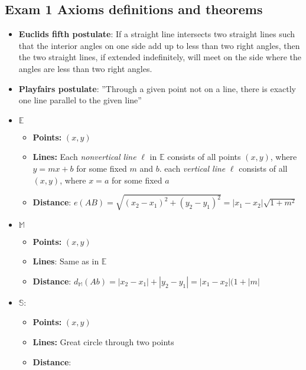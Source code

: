 \documentclass{report}
\begin{document}
    \subsection{Exam 1 Axioms definitions and theorems}
    \begin{itemize}
    \item \textbf{Euclids fifth postulate}: If a straight line intersects two straight lines such that the interior angles on one side add up to less than two right angles, then the two straight lines, if extended indefinitely, will meet on the side where the angles are less than two right angles.
    \item \textbf{Playfairs postulate}: ”Through a given point not on a line, there is exactly one line parallel to the given line”
        \item \textbf{$\mathbb{E}$}
            \begin{itemize}
                \item \textbf{Points:} $(x,y)$
                \item \textbf{Lines:} Each \textit{nonvertical line} $\ell$ in $\mathbb{E}$ consists of all points $(x,y)$, where $y = mx + b$ for some fixed $m$ and $b$. each \textit{vertical line} $\ell$ consists of all $(x,y)$, where $x=a$ for some fixed $a$
                \item \textbf{Distance}: $e(AB) = \sqrt{(x_{2} - x_{1})^{2} + (y_{2} - y_{1})^{2}} = \left\lvert x_{1}-x_{2} \right\rvert \sqrt{1+m^{2}}$
            \end{itemize}
        \item \textbf{$\mathbb{M}$}
            \begin{itemize}
                \item \textbf{Points:} $(x,y)$
                \item \textbf{Lines}: Same as in $\mathbb{E}$
                \item \textbf{Distance}: $d_{\mathbb{M}}(Ab) = \left\lvert x_{2} - x_{1} \right\rvert + \left\lvert y_{2} - y_{1} \right\rvert = \left\lvert x_{1} - x_{2} \right\rvert(1+\left\lvert m \right\rvert$ 
            \end{itemize}
        \item \textbf{$\mathbb{S}$}:
            \begin{itemize}
                \item \textbf{Points:} $(x,y)$
                \item \textbf{Lines:} Great circle through two points
                \item \textbf{Distance}:

\end{itemize}
\end{itemize}
\end{document}
